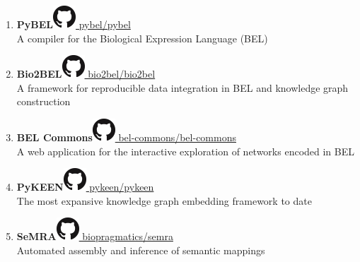 \documentclass[10pt,a4paper,sans]{moderncv} %
\begin{document}
    \vspace{0.3cm}

    \begin{enumerate}
    \itemsep0.5em
        \item \textbf{PyBEL}\hfill\href{https://github.com/pybel/pybel}{\includegraphics[scale=0.25]{img/GitHub-Mark-32px} pybel/pybel}
\\
    A compiler for the Biological Expression Language (BEL)

        \item \textbf{Bio2BEL}\hfill\href{https://github.com/bio2bel/bio2bel}{\includegraphics[scale=0.25]{img/GitHub-Mark-32px} bio2bel/bio2bel}
\\
    A framework for reproducible data integration in BEL and knowledge graph construction

        \item \textbf{BEL Commons}\hfill\href{https://github.com/bel-commons/bel-commons}{\includegraphics[scale=0.25]{img/GitHub-Mark-32px} bel-commons/bel-commons}
\\
    A web application for the interactive exploration of networks encoded in BEL

        \item \textbf{PyKEEN}\hfill\href{https://github.com/pykeen/pykeen}{\includegraphics[scale=0.25]{img/GitHub-Mark-32px} pykeen/pykeen}
\\
    The most expansive knowledge graph embedding framework to date

        \item \textbf{SeMRA}\hfill\href{https://github.com/biopragmatics/semra}{\includegraphics[scale=0.25]{img/GitHub-Mark-32px} biopragmatics/semra}
\\
    Automated assembly and inference of semantic mappings


\end{enumerate}
\end{document}
